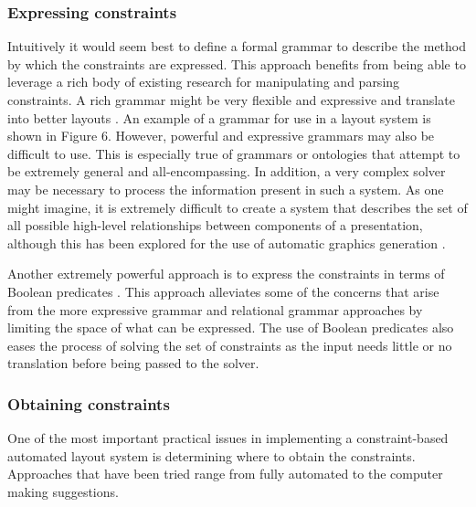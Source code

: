     \subsubsection{Expressing constraints}

     Intuitively it would seem best to define a formal grammar to describe the
     method by which the constraints are expressed. This approach benefits from
     being able to leverage a rich body of existing research for manipulating
     and parsing constraints. A rich grammar might be very flexible and
     expressive and translate into better layouts \citep{weitzman-1}. An example
     of a grammar for use in a layout system is shown in Figure 6. However,
     powerful and expressive grammars may also be difficult to use. This is
     especially true of grammars or ontologies that attempt to be extremely
     general and all-encompassing. In addition, a very complex solver may be
     necessary to process the information present in such a system. As one might
     imagine, it is extremely difficult to create a system that describes the
     set of all possible high-level relationships between components of a
     presentation, although this has been explored for the use of automatic
     graphics generation \citep{zhou-1}.

     Another extremely powerful approach is to express the constraints in terms
     of Boolean predicates \citep{graf-1}. This approach alleviates some of the
     concerns that arise from the more expressive grammar and relational grammar
     approaches by limiting the space of what can be expressed. The use of
     Boolean predicates also eases the process of solving the set of constraints
     as the input needs little or no translation before being passed to the
     solver.

    \subsubsection{Obtaining constraints}

     One of the most important practical issues in implementing a
     constraint-based automated layout system is determining where to obtain the
     constraints. Approaches that have been tried range from fully automated to
     the computer making suggestions.

